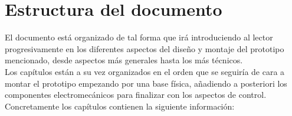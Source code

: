 \section{Estructura del documento}

El documento está organizado de tal forma que irá introduciendo al lector progresivamente en los diferentes aspectos del diseño y montaje del prototipo mencionado, desde aspectos más generales hasta los más técnicos.
\\

Los capítulos están a su vez organizados en el orden que se seguiría de cara a montar el prototipo empezando por una base física, añadiendo a posteriori los componentes electromecánicos para finalizar con los aspectos de control. Concretamente los capítulos contienen la siguiente información:

